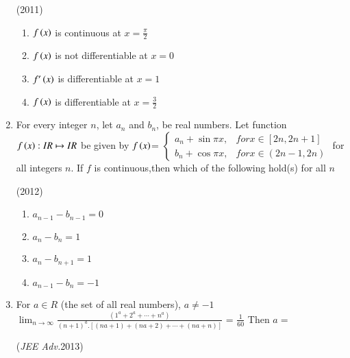 \documentclass[journal,12pt,twocolumn]{IEEEtran}
\theoremstyle{remark}
\begin{document}
\begin{enumerate}
\begin{flushleft}
    \hfill
    {(2011)}
   
    \begin{enumerate}[label=(\alph*)]
       
        \item $f\left(x\right)$ is continuous at $x=\frac{\pi}{2}$
        \item $f\left(x\right)$ is not differentiable at $x=0$
        \item $f'\left(x\right)$ is differentiable at $x=1$
        \item $f\left(x\right)$ is differentiable at $x=\frac{3}{2}$
    \end{enumerate}
\end{flushleft}

    \item
\begin{flushleft}
   
    {For every integer $n$, let $a_n$ and $b_n$, be real numbers. Let function $f\left(x\right): IR \mapsto IR$ be given by
    $f\left(x\right)$=
    $\begin{cases}
       a_n+\sin\pi x, & for x\in [2n,2n+1] \\
       b_n+\cos\pi x, & for x\in (2n-1,2n)
    \end{cases}$
    for all integers $n$. If $f$ is continuous,then which of the following hold(s) for all $n$}

    \hfill
    {(2012)}
   
    \begin{enumerate}[label=(\alph*)]
       
        \item $a_{n-1}-b_{n-1}=0$
        \item $a_n-b_n=1$
        \item $a_n-b_{n+1}=1$
        \item $a_{n-1}-b_n=-1$
    \end{enumerate}
\end{flushleft}

    \item
\begin{flushleft}
   
    {For $a\in R$ (the set of all real numbers), $a\neq -1$
    $\lim_{n\to\infty}\frac{(1^a+2^a+\cdots+n^a)}{(n+1)^a.[(na+1)+(na+2)+\cdots+(na+n)]}$ = $\frac{1}{60}$ Then $a=$ }

    \hfill
    {(\textit{JEE Adv.}2013)}
   
    \begin{enumerate}
       

\end{enumerate}
\end{flushleft}
\end{enumerate}
\end{document}
